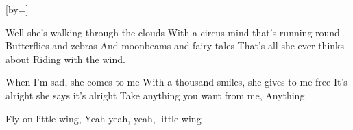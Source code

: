 

[by=]


\beginverse
Well she's walking through the clouds
With a circus mind that's running round
Butterflies and zebras
And moonbeams and fairy tales
That's all she ever thinks about
Riding with the wind.
\endverse

\beginverse
When I'm sad, she comes to me
With a thousand smiles, she gives to me free
It's alright she says it's alright
Take anything you want from me,
Anything.
\endverse

\beginverse
Fly on little wing,
Yeah yeah, yeah, little wing
\endverse



\chordson
\endsong
